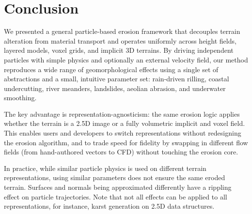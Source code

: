 \section{Conclusion}
\label{sec:erosion-conclusion}

We presented a general particle-based erosion framework that decouples terrain alteration from material transport and operates uniformly across height fields, layered models, voxel grids, and implicit 3D terrains. By driving independent particles with simple physics and optionally an external velocity field, our method reproduces a wide range of geomorphological effects using a single set of abstractions and a small, intuitive parameter set: rain-driven rilling, coastal undercutting, river meanders, landslides, aeolian abrasion, and underwater smoothing.

The key advantage is representation-agnosticism: the same erosion logic applies whether the terrain is a 2.5D image or a fully volumetric implicit and voxel field. This enables users and developers to switch representations without redesigning the erosion algorithm, and to trade speed for fidelity by swapping in different flow fields (from hand-authored vectors to CFD) without touching the erosion core.


In practice, while similar particle physics is used on different terrain representations, using similar parameters does not ensure the same eroded terrain. Surfaces and normals being approximated differently have a rippling effect on particle trajectories.  
Note that not all effects can be applied to all representations, for instance, karst generation on 2.5D data structures.

